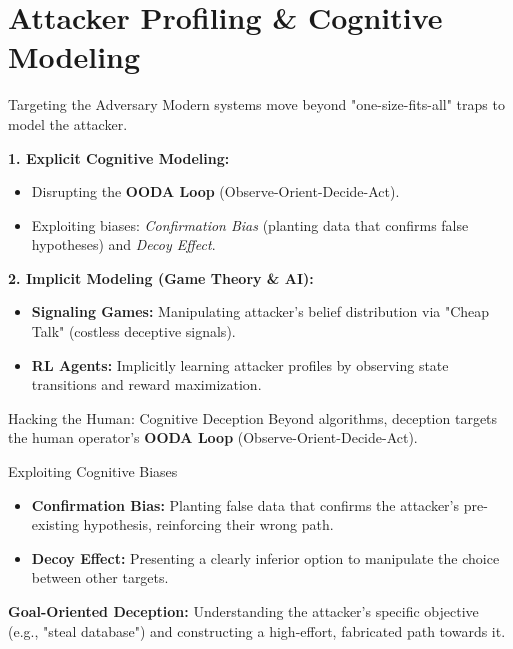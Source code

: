 \documentclass[12pt, aspectratio=169]{beamer}
\begin{document}
\section{Attacker Profiling \& Cognitive Modeling}
\begin{frame}{Targeting the Adversary}
    Modern systems move beyond "one-size-fits-all" traps to model the attacker.

    \vspace{0.5cm}
    \textbf{1. Explicit Cognitive Modeling:}
    \begin{itemize}
        \item Disrupting the \textbf{OODA Loop} (Observe-Orient-Decide-Act).
        \item Exploiting biases: \textit{Confirmation Bias} (planting data that confirms false hypotheses) and \textit{Decoy Effect}.
    \end{itemize}

    \textbf{2. Implicit Modeling (Game Theory \& AI):}
    \begin{itemize}
        \item \textbf{Signaling Games:} Manipulating attacker's belief distribution via "Cheap Talk" (costless deceptive signals).
        \item \textbf{RL Agents:} Implicitly learning attacker profiles by observing state transitions and reward maximization.
    \end{itemize}
\end{frame}

\begin{frame}{Hacking the Human: Cognitive Deception}
    Beyond algorithms, deception targets the human operator's \textbf{OODA Loop} (Observe-Orient-Decide-Act).

    \begin{block}{Exploiting Cognitive Biases}
        \begin{itemize}
            \item \textbf{Confirmation Bias:} Planting false data that confirms the attacker's pre-existing hypothesis, reinforcing their wrong path.
            \item \textbf{Decoy Effect:} Presenting a clearly inferior option to manipulate the choice between other targets.
        \end{itemize}
    \end{block}

    \textbf{Goal-Oriented Deception:}
    Understanding the attacker's specific objective (e.g., "steal database") and constructing a high-effort, fabricated path towards it.
\end{frame}
\end{document}
